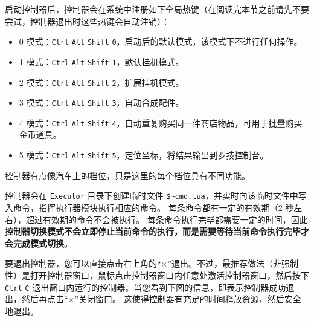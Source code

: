 启动控制器后，控制器会在系统中注册如下全局热键（在阅读完本节之前请先不要尝试，控制器退出时这些热键会自动注销）：

\begin{itemize}
    \item 0 模式：\lstinline{Ctrl} \lstinline{Alt} \lstinline{Shift} \lstinline{0}，启动后的默认模式，该模式下不进行任何操作。

    \item 1 模式：\lstinline{Ctrl} \lstinline{Alt} \lstinline{Shift} \lstinline{1}，默认挂机模式。

    \item 2 模式：\lstinline{Ctrl} \lstinline{Alt} \lstinline{Shift} \lstinline{2}，扩展挂机模式。

    \item 3 模式：\lstinline{Ctrl} \lstinline{Alt} \lstinline{Shift} \lstinline{3}，自动合成配件。

    \item 4 模式：\lstinline{Ctrl} \lstinline{Alt} \lstinline{Shift} \lstinline{4}，自动重复购买同一件商店物品，可用于批量购买金币道具。

    \item 5 模式：\lstinline{Ctrl} \lstinline{Alt} \lstinline{Shift} \lstinline{5}，定位坐标，将结果输出到罗技控制台。
\end{itemize}

控制器有点像汽车上的档位，只是这里的每个档位具有不同功能。

控制器会在 \lstinline{Executor} 目录下创建临时文件 \lstinline{$~cmd.lua}，并实时向该临时文件中写入命令，指挥执行器模块执行相应的命令。
每条命令都有一定的有效期（2 秒左右），超过有效期的命令不会被执行。
每条命令执行完毕都需要一定的时间，因此\textbf{\color{red}控制器切换模式不会立即停止当前命令的执行，而是需要等待当前命令执行完毕才会完成模式切换}。

要退出控制器，您可以直接点击右上角的“×”退出。不过，最推荐做法（非强制性）是打开控制器窗口，鼠标点击控制器窗口内任意处激活控制器窗口，然后按下 \lstinline{Ctrl} \lstinline{C} 退出窗口内运行的控制器。当您看到下图的信息，即表示控制器成功退出，然后再点击“×”关闭窗口。
这使得控制器有充足的时间释放资源，然后安全地退出。

